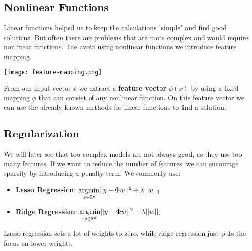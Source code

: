 \subsection{Nonlinear Functions}

Linear functions helped us to keep the calculations "simple" and find good solutions. But often there are problems that are more complex and would require nonlinear functions. The avoid using nonlinear functions we introduce feature mapping. 

\texttt{[image: feature-mapping.png]}

From our input vector $x$ we extract a \textbf{feature vector} $\phi(x)$ by using a fixed mapping $\phi$ that can consist of any nonlinear function. On this feature vector we can use the already known methods for linear functions to find a solution.

\subsection{Regularization}

We will later see that too complex models are not always good, as they use too many features. If we want to reduce the number of features, we can encourage sparsity by introducing a penalty term. We commonly use:
\begin{itemize}
	\item \textbf{Lasso Regression}: $\underset{w \in \mathbb{R}^d}{\text{argmin}} ||y - \Phi w||^2 + \lambda ||w||_1$
	\item \textbf{Ridge Regression}: $\underset{w \in \mathbb{R}^d}{\text{argmin}} ||y - \Phi w||^2 + \lambda ||w||_2$
\end{itemize}

Lasso regression sets a lot of weights to zero, while ridge regression just puts the focus on lower weights.